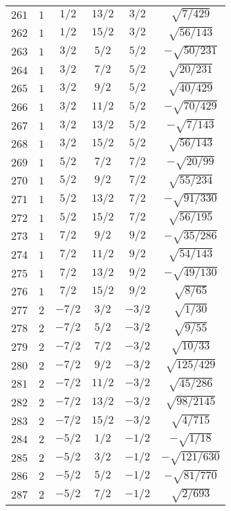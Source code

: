 \begin{table}
\begin{center}
\begin{tabular}{|c|c|c|c|c|c|}
$261$ & $1$ & $1/2$ & $13/2$ & $3/2$ & $\sqrt{7/429}$ \\ 
$262$ & $1$ & $1/2$ & $15/2$ & $3/2$ & $\sqrt{56/143}$ \\ 
$263$ & $1$ & $3/2$ & $5/2$ & $5/2$ & $-\sqrt{50/231}$ \\ 
$264$ & $1$ & $3/2$ & $7/2$ & $5/2$ & $\sqrt{20/231}$ \\ 
$265$ & $1$ & $3/2$ & $9/2$ & $5/2$ & $\sqrt{40/429}$ \\ 
$266$ & $1$ & $3/2$ & $11/2$ & $5/2$ & $-\sqrt{70/429}$ \\ 
$267$ & $1$ & $3/2$ & $13/2$ & $5/2$ & $-\sqrt{7/143}$ \\ 
$268$ & $1$ & $3/2$ & $15/2$ & $5/2$ & $\sqrt{56/143}$ \\ 
$269$ & $1$ & $5/2$ & $7/2$ & $7/2$ & $-\sqrt{20/99}$ \\ 
$270$ & $1$ & $5/2$ & $9/2$ & $7/2$ & $\sqrt{55/234}$ \\ 
$271$ & $1$ & $5/2$ & $13/2$ & $7/2$ & $-\sqrt{91/330}$ \\ 
$272$ & $1$ & $5/2$ & $15/2$ & $7/2$ & $\sqrt{56/195}$ \\ 
$273$ & $1$ & $7/2$ & $9/2$ & $9/2$ & $-\sqrt{35/286}$ \\ 
$274$ & $1$ & $7/2$ & $11/2$ & $9/2$ & $\sqrt{54/143}$ \\ 
$275$ & $1$ & $7/2$ & $13/2$ & $9/2$ & $-\sqrt{49/130}$ \\ 
$276$ & $1$ & $7/2$ & $15/2$ & $9/2$ & $\sqrt{8/65}$ \\ 
$277$ & $2$ & $-7/2$ & $3/2$ & $-3/2$ & $\sqrt{1/30}$ \\ 
$278$ & $2$ & $-7/2$ & $5/2$ & $-3/2$ & $\sqrt{9/55}$ \\ 
$279$ & $2$ & $-7/2$ & $7/2$ & $-3/2$ & $\sqrt{10/33}$ \\ 
$280$ & $2$ & $-7/2$ & $9/2$ & $-3/2$ & $\sqrt{125/429}$ \\ 
$281$ & $2$ & $-7/2$ & $11/2$ & $-3/2$ & $\sqrt{45/286}$ \\ 
$282$ & $2$ & $-7/2$ & $13/2$ & $-3/2$ & $\sqrt{98/2145}$ \\ 
$283$ & $2$ & $-7/2$ & $15/2$ & $-3/2$ & $\sqrt{4/715}$ \\ 
$284$ & $2$ & $-5/2$ & $1/2$ & $-1/2$ & $-\sqrt{1/18}$ \\ 
$285$ & $2$ & $-5/2$ & $3/2$ & $-1/2$ & $-\sqrt{121/630}$ \\ 
$286$ & $2$ & $-5/2$ & $5/2$ & $-1/2$ & $-\sqrt{81/770}$ \\ 
$287$ & $2$ & $-5/2$ & $7/2$ & $-1/2$ & $\sqrt{2/693}$ \\ 

\end{tabular}
\end{center}
\end{table}
